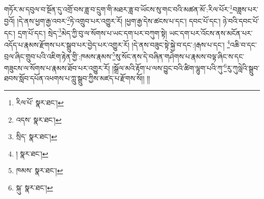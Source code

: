 གཏོར་མ་དབུལ་བ་སྔོན་དུ་འགྲོ་བས་ཟླ་བ་དྲུག་གི་མཐར་ཟླ་བ་ཡོངས་སུ་གང་བའི་མཚན་མོ་:རིལ་པོར་\footnote{རིལ་པོ་  སྣར་ཐང་། }བཟླས་པར་བྱའོ། །དེ་ནས་ཕྱག་རྒྱ་འབར་\footnote{འདས་  སྣར་ཐང་། }ཏེ་འགྲུབ་པར་འགྱུར་རོ། །ཕྱག་རྒྱ་དེས་ཚངས་པ་དང་། དབང་པོ་དང་། ཉེ་བའི་དབང་པོ་དང་། དྲག་པོ་དང་། སྲེད་\footnote{སྲིད་  སྣར་ཐང་། }མེད་ཀྱི་བུ་ལ་སོགས་པ་ཡང་དག་པར་བཀུག་སྟེ། ཡང་དག་པར་འོངས་ནས་མངོན་པར་འདོད་པ་རྣམས་རྫོགས་པར་སྒྲུབ་པར་བྱེད་པར་འགྱུར་རོ། །དེ་ནས་བཟུང་སྟེ་སྐྱེ་བ་དང་:།རྒས་པ་དང་། \footnote{།   སྣར་ཐང་། }འཆི་བ་དང་བྲལ་ཞིང་གྲུབ་པའི་འཇིག་རྟེན་གྱི་:ཁམས་རྣམས་\footnote{ཁམས་  སྣར་ཐང་། }སུ་སོང་ནས་དེ་བཞིན་གཤེགས་པ་རྣམས་བལྟ་ཞིང་ས་དང་གཟུངས་ལ་སོགས་པ་རྣམས་ཐོབ་པར་འགྱུར་རོ། །སྒྲོལ་མའི་རྟོག་པ་ལས་བྱུང་བའི་ཚིག་ལྷུག་པའི་ཀུ་\footnote{སྐུ་  སྣར་ཐང་། }རུ་ཀུལླེའི་སྒྲུབ་ཐབས་སློབ་དཔོན་འཕགས་པ་ཀླུ་སྒྲུབ་ཀྱིས་མཛད་པ་རྫོགས་སོ།། །།